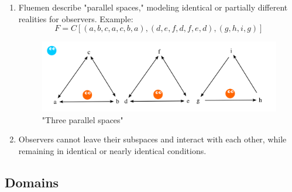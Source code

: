 \documentclass[final]{article}
\begin{document}
            \begin{enumerate}

                \item Fluemen describe "parallel spaces," modeling identical or 
                partially different realities for observers. Example: \[ F = 
                C[(a,b,c,a,c,b,a), (d,e,f,d,f,e,d), (g,h,i,g)] \]

                \begin{figure}[H]
                    \centering
                    \includegraphics[width=\textwidth]{./parallel.png}
                    \caption{"Three parallel spaces"}
                    \label{fig:image}
                \end{figure}

                \item Observers cannot leave their subspaces and interact with 
                each other, while remaining in identical or nearly identical 
                conditions.

            \end{enumerate}



        \subsection{Domains}
\end{document}
